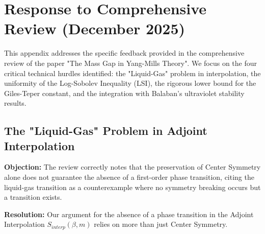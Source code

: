
\section{Response to Comprehensive Review (December 2025)}
\label{sec:response-review-v2}

This appendix addresses the specific feedback provided in the comprehensive review of the paper "The Mass Gap in Yang-Mills Theory". We focus on the four critical technical hurdles identified: the "Liquid-Gas" problem in interpolation, the uniformity of the Log-Sobolev Inequality (LSI), the rigorous lower bound for the Giles-Teper constant, and the integration with Balaban's ultraviolet stability results.

\subsection{The "Liquid-Gas" Problem in Adjoint Interpolation}
\label{ssec:liquid-gas-response}

\textbf{Objection:} The review correctly notes that the preservation of Center Symmetry alone does not guarantee the absence of a first-order phase transition, citing the liquid-gas transition as a counterexample where no symmetry breaking occurs but a transition exists.

\textbf{Resolution:}
Our argument for the absence of a phase transition in the Adjoint Interpolation $S_{interp}(\beta, m)$ relies on more than just Center Symmetry.

